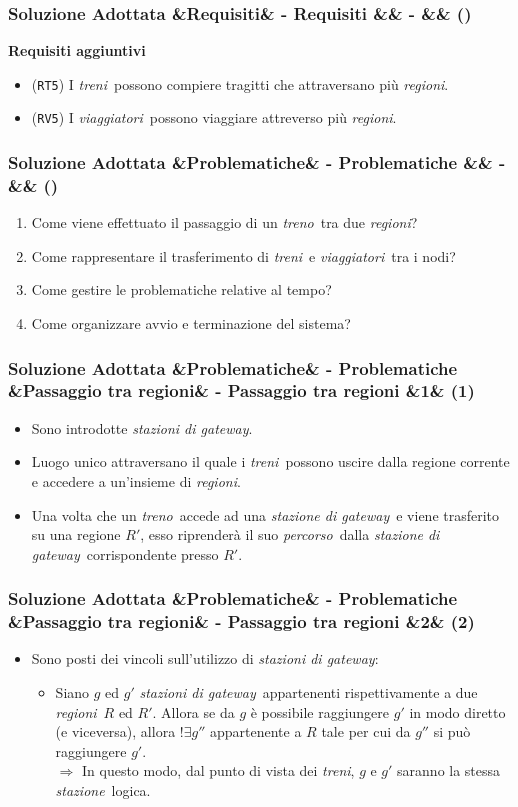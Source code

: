 \documentclass[slidestop,compress,blackandwhite]{beamer}
\newcommand{\ttt}[1]{\texttt{#1}}
\newcommand{\ii}[1]{\textit{#1}}
\newcommand{\treno}{\ii{treno}}
\newcommand{\treni}{\ii{treni}}
\newcommand{\viaggiatori}{\ii{viaggiatori}}
\newcommand{\stazione}{\ii{stazione}}
\newcommand{\route}{\ii{percorso}}
\newcommand{\regioni}{\ii{regioni}}
\newcommand{\gateway}{\ii{stazione di gateway}}
\newcommand{\gateways}{\ii{stazioni di gateway}}
\newcommand{\newtitle}[4]{
	#1 
	\ifx&#2&%
	\else
  		\large- #2
	\fi
	\ifx&#3&%
	\else
  		\normalsize- #3
	\fi
	\ifx&#4&%
	\else
  		\normalsize (#4)
	\fi
}
\newcommand{\newframe}[5]{
	\begin{frame}
		\frametitle{\newtitle{#1}{#2}{#3}{#4}}
		#5
	\end{frame}
}
\newcommand{\itemt}[1]{\item (\ttt{#1})}
\newcommand{\myitemize}[1]{\begin{itemize}#1\end{itemize}}
\begin{document}
	\newframe{Soluzione Adottata}{Requisiti}{}{}{
		\vspace{0.5cm}
		\textbf{Requisiti aggiuntivi}
		\begin{itemize}
			\itemt{RT5} I \treni~possono compiere tragitti che attraversano più \regioni.
			\itemt{RV5} I \viaggiatori~possono viaggiare attreverso più \regioni.
		\end{itemize}
	}
	
	\newframe{Soluzione Adottata}{Problematiche}{}{}{
		\vspace{0.5cm}
		\begin{enumerate}
			\item Come viene effettuato il passaggio di un \treno~tra due \regioni? 
			\vspace{0.4cm}
			\item Come rappresentare il trasferimento di \treni~e \viaggiatori~tra i nodi? 
			\vspace{0.4cm}
			\item Come gestire le problematiche relative al tempo?
			\vspace{0.4cm}
			\item Come organizzare avvio e terminazione del sistema?
		\end{enumerate}
	}
	
	\newframe{Soluzione Adottata}{Problematiche}{Passaggio tra regioni}{1}{
		\vspace{0.5cm}
		\myitemize{
			\item Sono introdotte \gateways.
			\item Luogo unico attraversano il quale i \treni~possono uscire dalla regione corrente e accedere a un'insieme di \regioni.
			\item Una volta che un \treno~accede ad una \gateway~e viene trasferito su una regione $R'$, esso riprenderà il suo \route~dalla \gateway~corrispondente presso $R'$. 
		}
	}
	
	\newframe{Soluzione Adottata}{Problematiche}{Passaggio tra regioni}{2}{
		\vspace{0.5cm}
		\myitemize{
			\item Sono posti dei vincoli sull'utilizzo di \gateways:
				\myitemize{
					\item Siano $g$ ed $g'$ \gateways~appartenenti rispettivamente a due \regioni~$R$ ed $R'$. Allora se da $g$ è possibile raggiungere $g'$ in modo diretto (e viceversa), allora $!\exists g''$ appartenente a $R$ tale per cui da $g''$ si può raggiungere $g'$.\\
					$\Rightarrow$ In questo modo, dal punto di vista dei \treni, $g$ e $g'$ saranno la stessa \stazione~logica.
				
				}
		}
	}
	
\end{document}
